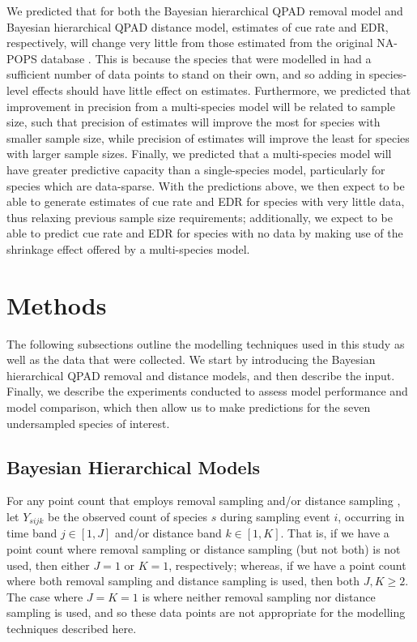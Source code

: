 \documentclass[12pt]{article}
\begin{document}
\par We predicted that for both the Bayesian hierarchical QPAD removal model and Bayesian hierarchical QPAD distance model, estimates of cue rate and EDR, respectively, will change very little from those estimated from the original NA-POPS database \cite{edwards_point_2023}. 
This is because the species that were modelled in \citet{edwards_point_2023} had a sufficient number of data points to stand on their own, and so adding in species-level effects should have little effect on estimates. 
Furthermore, we predicted that improvement in precision from a multi-species model will be related to sample size, such that precision of estimates will improve the most for species with smaller sample size, while precision of estimates will improve the least for species with larger sample sizes.
Finally, we predicted that a multi-species model will have greater predictive capacity than a single-species model, particularly for species which are data-sparse.
With the predictions above, we then expect to be able to generate estimates of cue rate and EDR for species with very little data, thus relaxing previous sample size requirements; additionally, we expect to be able to predict cue rate and EDR for species with no data by making use of the shrinkage effect offered by a multi-species model.

\section{Methods}

\par The following subsections outline the modelling techniques used in this study as well as the data that were collected. 
We start by introducing the Bayesian hierarchical QPAD removal and distance models, and then describe the input.
Finally, we describe the experiments conducted to assess model performance and model comparison, which then allow us to make predictions for the seven undersampled species of interest.

\subsection{Bayesian Hierarchical Models}

\par For any point count that employs removal sampling \citep{alldredge_time--detection_2007, farnsworth_removal_2002} and/or distance sampling \citep{buckland_introduction_2001, buckland_distance_2015}, let $Y_{sijk}$ be the observed count of species $s$ during sampling event $i$, occurring in time band $j \in [1,J]$ and/or distance band $k \in [1,K]$.
That is, if we have a point count where removal sampling or distance sampling (but not both) is not used, then either $J = 1$ or $K = 1$, respectively; whereas, if we have a point count where both removal sampling and distance sampling is used, then both $J,K \geq 2$.
The case where $J = K = 1$ is where neither removal sampling nor distance sampling is used, and so these data points are not appropriate for the modelling techniques described here.
\end{document}
